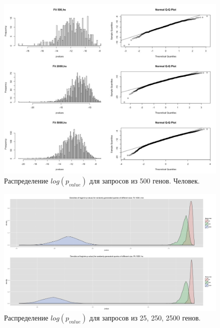\documentclass[10pt,pdf,utf8,russian,aspectratio=169]{beamer}
\begin{document}
   
\begin{frame}
    \begin{figure}[p]
        \centering
        \caption{Распределение $log(p_{value})$ для запросов из 500 генов. Человек.}
        \includegraphics[height=0.95\textheight]{./img/converge_to_norm_query_size_500_hs.jpeg}
    \end{figure}
\end{frame}

\begin{frame}
    \begin{figure}[!ht]
        \centering
        \caption{Распределение $log(p_{value})$ для запросов из 25, 250, 2500 генов.}
        \includegraphics[width=\textwidth]{./img/densities_size_25_25_2500_fit_1000.jpeg}
    \end{figure}
\end{frame}
\end{document}

